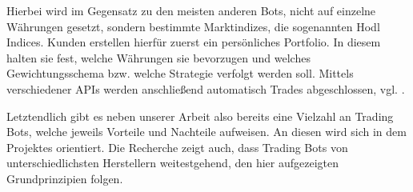 Hierbei wird im Gegensatz zu den meisten anderen Bots, nicht auf einzelne Währungen
gesetzt, sondern bestimmte Marktindizes, die sogenannten Hodl Indices. Kunden erstellen hierfür
zuerst ein persönliches Portfolio. In diesem halten sie fest, welche Währungen sie bevorzugen und
welches Gewichtungsschema bzw. welche Strategie verfolgt werden soll. Mittels verschiedener APIs
werden anschließend automatisch Trades abgeschlossen, vgl. \cite{gekko}.

Letztendlich gibt es neben unserer Arbeit also bereits eine Vielzahl an Trading Bots, welche jeweils
Vorteile und Nachteile aufweisen. An diesen wird sich in dem Projektes orientiert. Die
Recherche zeigt auch, dass Trading Bots von unterschiedlichsten Herstellern weitestgehend, den hier
aufgezeigten Grundprinzipien folgen.
